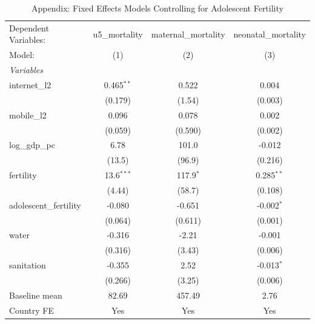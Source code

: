 \begin{table}[htbp]
   \caption{\label{tab:appendix_adolescent_fertility} Appendix: Fixed Effects Models Controlling for Adolescent Fertility}
   \centering
   \begin{tabular}{lccc}
      \tabularnewline \midrule \midrule
      Dependent Variables:   & u5\_mortality  & maternal\_mortality  & neonatal\_mortality\\   
      Model:                 & (1)            & (2)                  & (3)\\  
      \midrule
      \emph{Variables}\\
      internet\_l2           & 0.465$^{**}$   & 0.522                & 0.004\\   
                             & (0.179)        & (1.54)               & (0.003)\\   
      mobile\_l2             & 0.096          & 0.078                & 0.002\\   
                             & (0.059)        & (0.590)              & (0.002)\\   
      log\_gdp\_pc           & 6.78           & 101.0                & -0.012\\   
                             & (13.5)         & (96.9)               & (0.216)\\   
      fertility              & 13.6$^{***}$   & 117.9$^{*}$          & 0.285$^{**}$\\   
                             & (4.44)         & (58.7)               & (0.108)\\   
      adolescent\_fertility  & -0.080         & -0.651               & -0.002$^{*}$\\   
                             & (0.064)        & (0.611)              & (0.001)\\   
      water                  & -0.316         & -2.21                & -0.001\\   
                             & (0.316)        & (3.43)               & (0.006)\\   
      sanitation             & -0.355         & 2.52                 & -0.013$^{*}$\\   
                             & (0.266)        & (3.25)               & (0.006)\\   
      Baseline mean          & 82.69          & 457.49               & 2.76\\  
      Country FE             & Yes            & Yes                  & Yes\\  

\end{tabular}
\end{table}
